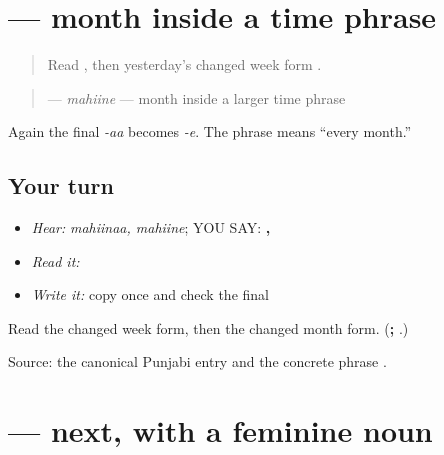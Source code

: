 \section[\texorpdfstring{\pa{ਮਹੀਨੇ} (mahiine)}{ਮਹੀਨੇ (mahiine)}]{ — month inside a time phrase}

\label{lesson:PA-C184-mahine}



\begin{quote}
Read \textbf{}, then yesterday’s changed week form \textbf{}.
\end{quote}

\begin{grammarlens}[title={Grammar Lens: make the same ending change}]
\begin{quote}
\textbf{} — \emph{mahiine} — month inside a larger time phrase
\end{quote}

Again the final \emph{-aa} becomes \emph{-e}. The phrase \textbf{ } means “every month.”
\end{grammarlens}

\subsection*{Your turn}
\begin{itemize}
\raggedright
  \item \emph{Hear:} \emph{mahiinaa, mahiine}; YOU SAY: \textbf{, }
  \item \emph{Read it:} \textbf{ }
  \item \emph{Write it:} copy \textbf{} once and check the final \textbf{}
\end{itemize}

\begin{tcolorbox}[breakable,colback=teal!4,colframe=teal!35!black,title={Before you move on}]
Read the changed week form, then the changed month form. (\textbf{; }.)

Source: the canonical Punjabi \textbf{} entry and the concrete phrase \textbf{ }.
\end{tcolorbox}
\section[\texorpdfstring{\pa{ਅਗਲੀ} (aglii)}{ਅਗਲੀ (aglii)}]{ — next, with a feminine noun}

